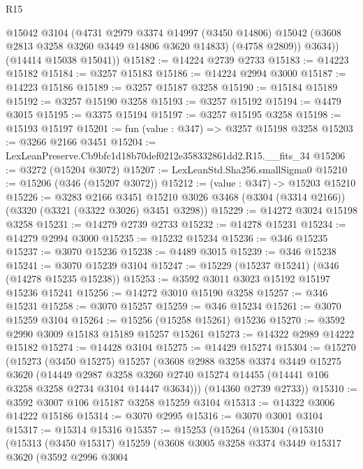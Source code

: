 \begin{lexlean}{R15}
\begin{coremodule}
          @15042
          @3104
          (@4731
            @2979
            @3374
            @14997
            (@3450 @14806)
            @15042
            (@3608 @2813 @3258 @3260 @3449 @14806 @3620 @14833)
            (@4758 @2809))
          @3634))
      (@14414 @15038 @15041))
@15182 := @14224 @2739 @2733
@15183 := @14223 @15182
@15184 := @3257 @15183
@15186 := @14224 @2994 @3000
@15187 := @14223 @15186
@15189 := @3257 @15187 @3258
@15190 := @15184 @15189
@15192 := @3257 @15190 @3258
@15193 := @3257 @15192
@15194 := @4479 @3015
@15195 := @3375 @15194
@15197 := @3257 @15195 @3258
@15198 := @15193 @15197
@15201 := fun (value : @347) => @3257 @15198 @3258
@15203 := @3266 @2166 @3451
@15204 := LexLeanPreserve.Cb9bfc1d18b70def0212e358332861dd2.R15.__fits_34
@15206 := @3272 (@15204 @3072)
@15207 := LexLeanStd.Sha256.smallSigma0
@15210 := @15206 (@346 (@15207 @3072))
@15212 := (value : @347) -> @15203 @15210
@15226 := @3283
    @2166
    @3451
    @15210
    @3026
    @3468
    (@3304 (@3314 @2166))
    (@3320 (@3321 (@3322 @3026) @3451 @3298))
@15229 := @14272 @3024 @15198 @3258
@15231 := @14279 @2739 @2733
@15232 := @14278 @15231
@15234 := @14279 @2994 @3000
@15235 := @15232 @15234
@15236 := @346 @15235
@15237 := @3070 @15236
@15238 := @4489 @3015
@15239 := @346 @15238
@15241 := @3070 @15239 @3104
@15247 := @15229 (@15237 @15241) (@346 (@14278 @15235 @15238))
@15253 := @3592 @3011 @3023 @15192 @15197 @15236 @15241
@15256 := @14272 @3010 @15190 @3258
@15257 := @346 @15231
@15258 := @3070 @15257
@15259 := @346 @15234
@15261 := @3070 @15259 @3104
@15264 := @15256 (@15258 @15261) @15236
@15270 := @3592 @2990 @3009 @15183 @15189 @15257 @15261
@15273 := @14322 @2989 @14222 @15182
@15274 := @14428 @3104
@15275 := @14429 @15274
@15304 := @15270
    (@15273
      (@3450 @15275)
      @15257
      (@3608
        @2988
        @3258
        @3374
        @3449
        @15275
        @3620
        (@14449
          @2987
          @3258
          @3260
          @2740
          @15274
          @14455
          (@14441 @106 @3258 @3258 @2734 @3104 @14447 @3634)))
      (@14360 @2739 @2733))
@15310 := @3592 @3007 @106 @15187 @3258 @15259 @3104
@15313 := @14322 @3006 @14222 @15186
@15314 := @3070 @2995
@15316 := @3070 @3001 @3104
@15317 := @15314 @15316
@15357 := @15253
    (@15264
      (@15304
        (@15310
          (@15313
            (@3450 @15317)
            @15259
            (@3608
              @3005
              @3258
              @3374
              @3449
              @15317
              @3620
              (@3592
                @2996
                @3004

\end{coremodule}
\end{lexlean}
